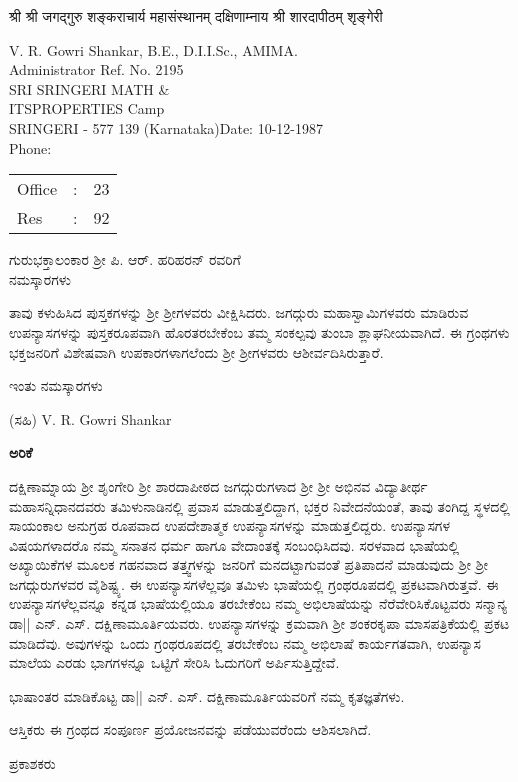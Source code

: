 {\dn श्री श्री जगद्गुरु शङ्कराचार्य महासंस्थानम् दक्षिणाम्नाय श्री शारदापीठम् शृङ्गेरी}\\


{\eng V. R. Gowri Shankar, B.E., D.I.I.Sc., AMIMA.\\
Administrator \hfill{Ref. No. 2195}\\
SRI SRINGERI MATH \&\\
ITSPROPERTIES \hfill{Camp}\\
SRINGERI - 577 139 (Karnataka)\hfill{Date: 10-12-1987}\\

Phone: 
\begin{tabular}{lll}
Office  & : & 23\\
Res  & : & 92
\end{tabular}
}

\bigskip

\begin{center}
{\large{ಗುರುಭಕ್ತಾಲಂಕಾರ ಶ್ರೀ ಪಿ. ಆರ್. ಹರಿಹರನ್ ರವರಿಗೆ\\  ನಮಸ್ಕಾರಗಳು}}

\begin{minipage}{8cm}
ತಾವು ಕಳುಹಿಸಿದ ಪುಸ್ತಕಗಳನ್ನು ಶ್ರೀ ಶ್ರೀಗಳವರು ವೀಕ್ಷಿಸಿ\-ದರು. ಜಗದ್ಗುರು
ಮಹಾಸ್ವಾಮಿಗಳವರು ಮಾಡಿರುವ ಉಪನ್ಯಾಸಗಳನ್ನು ಪುಸ್ತಕರೂಪವಾಗಿ
ಹೊರತರಬೇಕೆಂಬ ತಮ್ಮ ಸಂಕಲ್ಪವು ತುಂಬಾ ಶ್ಲಾಘನೀಯವಾಗಿದೆ. ಈ
ಗ್ರಂಥ\-ಗಳು ಭಕ್ತಜನರಿಗೆ ವಿಶೇಷವಾಗಿ ಉಪಕಾರಗಳಾಗಲೆಂದು ಶ್ರೀ
ಶ್ರೀಗಳವರು ಆಶೀರ್ವದಿಸಿರುತ್ತಾರೆ. 
\end{minipage}
\end{center}

\hfill{ಇಂತು ನಮಸ್ಕಾರಗಳು}

\hfill{(ಸಹಿ) {\eng V. R. Gowri Shankar}}

\eject

\begin{center}
{\huge\bfseries{ಅರಿಕೆ}}
\end{center}

\medskip

ದಕ್ಷಿಣಾಮ್ನಾಯ ಶ್ರೀ ಶೃಂಗೇರಿ ಶ್ರೀ ಶಾರದಾಪೀಠದ ಜಗದ್ಗುರುಗಳಾದ ಶ್ರೀ ಶ್ರೀ ಅಭಿನವ ವಿದ್ಯಾತೀರ್ಥ ಮಹಾಸನ್ನಿಧಾನದವರು 
ತಮಿಳುನಾಡಿನಲ್ಲಿ ಪ್ರವಾಸ ಮಾಡುತ್ತಲಿದ್ದಾಗ, ಭಕ್ತರ ನಿವೇದನೆಯಂತೆ, ತಾವು ತಂಗಿದ್ದ ಸ್ಥಳದಲ್ಲಿ ಸಾಯಂಕಾಲ ಅನುಗ್ರಹ 
ರೂಪವಾದ ಉಪದೇಶಾತ್ಮಕ ಉಪನ್ಯಾಸಗಳನ್ನು ಮಾಡುತ್ತಲಿದ್ದರು. ಉಪನ್ಯಾಸಗಳ ವಿಷಯಗಳಾದರೊ ನಮ್ಮ ಸನಾತನ 
ಧರ್ಮ ಹಾಗೂ ವೇದಾಂತಕ್ಕೆ ಸಂಬಂಧಿಸಿದವು. ಸರಳವಾದ ಭಾಷೆಯಲ್ಲಿ ಅಖ್ಯಾಯಿಕೆಗಳ ಮೂಲಕ ಗಹನವಾದ ತತ್ತ್ವಗಳನ್ನು 
ಜನರಿಗೆ ಮನದಟ್ಟಾಗುವಂತೆ ಪ್ರತಿಪಾದನೆ ಮಾಡುವುದು ಶ್ರೀ ಶ್ರೀ ಜಗದ್ಗುರುಗಳವರ ವೈಶಿಷ್ಟ್ಯ. ಈ ಉಪನ್ಯಾಸಗಳೆಲ್ಲವೂ ತಮಿಳು 
ಭಾಷೆಯಲ್ಲಿ ಗ್ರಂಥರೂಪದಲ್ಲಿ ಪ್ರಕಟವಾಗಿರುತ್ತವೆ. ಈ ಉಪನ್ಯಾಸಗಳೆಲ್ಲವನ್ನೂ ಕನ್ನಡ ಭಾಷೆಯಲ್ಲಿಯೂ ತರಬೇಕೆಂಬ ನಮ್ಮ 
ಅಭಿಲಾಷೆಯನ್ನು ನೆರೆವೇರಿಸಿಕೊಟ್ಟವರು ಸನ್ಮಾನ್ಯ ಡಾ|| ಎನ್. ಎಸ್. ದಕ್ಷಿಣಾಮೂರ್ತಿಯವರು. ಉಪನ್ಯಾಸಗಳನ್ನು ಕ್ರಮವಾಗಿ 
ಶ್ರೀ ಶಂಕರಕೃಪಾ ಮಾಸಪತ್ರಿಕೆಯಲ್ಲಿ ಪ್ರಕಟ ಮಾಡಿದೆವು. ಅವುಗಳನ್ನು ಒಂದು ಗ್ರಂಥರೂಪದಲ್ಲಿ ತರಬೇಕೆಂಬ ನಮ್ಮ ಅಭಿಲಾಷೆ ಕಾರ್ಯಗತವಾಗಿ, 
ಉಪನ್ಯಾಸ ಮಾಲೆಯ ಎರಡು ಭಾಗಗಳನ್ನೂ ಒಟ್ಟಿಗೆ ಸೇರಿಸಿ ಓದುಗರಿಗೆ ಅರ್ಪಿಸುತ್ತಿದ್ದೇವೆ. 

ಭಾಷಾಂತರ ಮಾಡಿಕೊಟ್ಟ ಡಾ|| ಎನ್. ಎಸ್. ದಕ್ಷಿಣಾಮೂರ್ತಿಯವರಿಗೆ ನಮ್ಮ ಕೃತಜ್ಞತೆಗಳು.

ಆಸ್ತಿಕರು ಈ ಗ್ರಂಥದ ಸಂಪೂರ್ಣ ಪ್ರಯೋಜನವನ್ನು ಪಡೆಯುವರೆಂದು ಆಶಿಸಲಾಗಿದೆ.


\vskip 1cm

\hfill{ಪ್ರಕಾಶಕರು}

